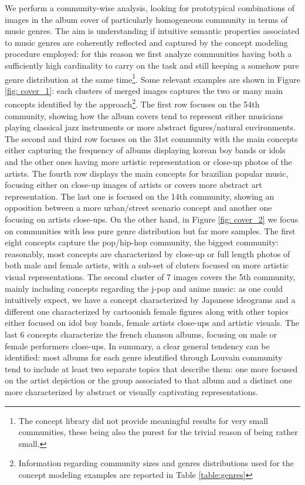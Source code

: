 \documentclass[sigchi]{acmart}
\begin{document}
We perform a community-wise analysis, looking for prototypical combinations of images in the album cover of particularly homogeneous community in terms of music genres. The aim is understanding if intuitive semantic properties associated to music genres are coherently reflected and captured by the concept modeling procedure employed: for this reason we first analyze communities having both a sufficiently high cardinality to carry on the task and still keeping a somehow pure genre distribution at the same time\footnote{The concept library did not provide meaningful results for very small communities, these being also the purest for the trivial reason of being rather small.}. Some relevant examples are shown in Figure \ref{fig: cover_1}: each clusters of merged images captures the two or many main concepts identified by the approach\footnote{Information regarding community sizes and genres distributions used for the concept modeling examples are reported in Table \ref{table:genres}}. The first row focuses on the 54th community, showing how the album covers tend to represent either musicians playing classical jazz instruments or more abstract figures/natural environments. The second and third row focuses on the 31st community with the main concepts either capturing the frequency of albums displaying korean boy bands or idols and the other ones having more artistic representation or close-up photos of the artists. The fourth row displays the main concepts for brazilian popular music, focusing either on close-up images of artists or covers more abstract art representation. The last one is focused on the 14th community, showing an opposition between a more urban/street scenario concept and another one focusing on artists close-ups. On the other hand, in Figure \ref{fig: cover_2} we focus on communities with less pure genre distribution but far more samples. The first eight concepts capture the pop/hip-hop community, the biggest community: reasonably, most concepts are characterized by close-up or full length photos of both male and female artists, with a sub-set of cluters focused on more artistic visual representations. The second cluster of 7 images covers the  5th community, mainly including concepts regarding the j-pop and anime music: as one could intuitively expect, we have a concept  characterized by Japanese ideograms and a different one characterized by cartoonish female figures along with other topics either focused on idol boy bands, female artists close-ups and artistic visuals. The last 6 concepts characterize the french chanson albums, focusing on male or female performers close-ups. In summary, a clear general tendency can be identified: most albums for each genre identified through Louvain community tend to include at least two separate topics that describe them: one more focused on the artist depiction or the group associated to that album and a distinct one more characterized by abstract or visually captivating representations.
\end{document}

